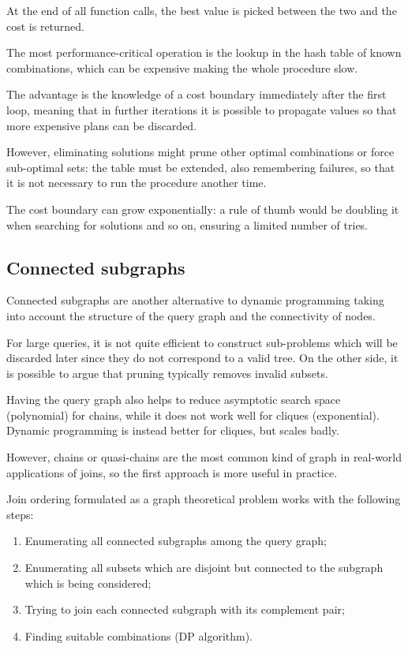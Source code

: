 At the end of all function calls, the best value is picked between the two and the cost is returned. 

The most performance-critical operation is the lookup in the hash table of known combinations, which can be expensive making the whole procedure slow.

The advantage is the knowledge of a cost boundary immediately after the first loop, meaning that in further iterations it is possible to propagate values so that more expensive plans can be discarded.

However, eliminating solutions might prune other optimal combinations or force sub-optimal sets: the table must be extended, also remembering failures, so that it is not necessary to run the procedure another time.

The cost boundary can grow exponentially: a rule of thumb would be doubling it when searching for solutions and so on, ensuring a limited number of tries. 

\subsection{Connected subgraphs}
Connected subgraphs are another alternative to dynamic programming taking into account the structure of the query graph and the connectivity of nodes.

For large queries, it is not quite efficient to construct sub-problems which will be discarded later since they do not correspond to a valid tree. On the other side, it is possible to argue that pruning typically removes invalid subsets.

Having the query graph also helps to reduce asymptotic search space (polynomial) for chains, while it does not work well for cliques (exponential). Dynamic programming is instead better for cliques, but scales badly.

However, chains or quasi-chains are the most common kind of graph in real-world applications of joins, so the first approach is more useful in practice.

Join ordering formulated as a graph theoretical problem works with the following steps:

\begin{enumerate}
	\item Enumerating all connected subgraphs among the query graph;
	\item Enumerating all subsets which are disjoint but connected to the subgraph which is being considered;
	\item Trying to join each connected subgraph with its complement pair;
	\item Finding suitable combinations (DP algorithm).
\end{enumerate}

